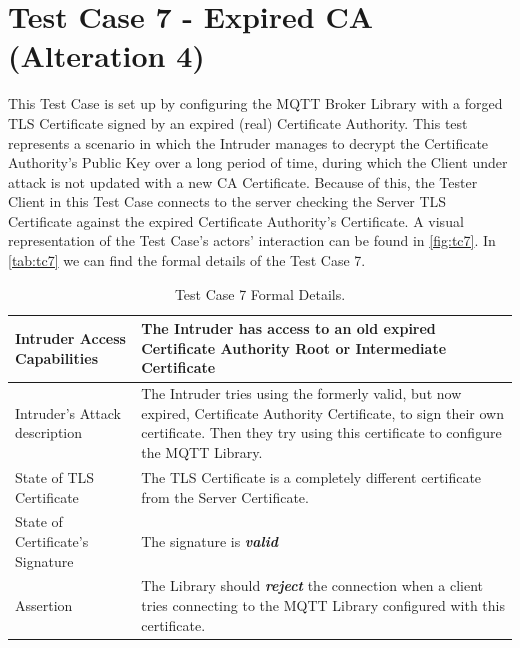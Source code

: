 \documentclass[binding=0.6cm,noexaminfo]{sapthesis}
\begin{document}
\section{Test Case 7 - Expired CA (Alteration 4)}
This Test Case is set up by configuring the MQTT Broker Library with a forged TLS Certificate signed by an expired (real) Certificate Authority. This test represents a scenario in which the Intruder manages to decrypt the Certificate Authority’s Public Key over a long period of time, during which the Client under attack is not updated with a new CA Certificate. Because of this, the Tester Client in this Test Case connects to the server checking the Server TLS Certificate against the expired Certificate Authority’s Certificate. A visual representation of the Test Case's actors' interaction can be found in \autoref{fig:tc7}.  In \autoref{tab:tc7} we can find the formal details of the Test Case 7.

\begin{table}
\begin{center}
\begin{tabular}{| p{6cm} | p{6cm} |}
\hline
Intruder Access Capabilities & The Intruder has access to an old expired Certificate Authority Root or Intermediate Certificate \\
\hline
Intruder’s Attack description & The Intruder tries using the formerly valid, but now expired, Certificate Authority Certificate, to sign their own certificate. Then they try using this certificate to configure the MQTT Library. \\
\hline
State of TLS Certificate & The TLS Certificate is a completely different certificate from the Server Certificate. \\
\hline
State of Certificate’s Signature & The signature is \textbf{\textit{valid}} \\
\hline
Assertion & The Library should \textbf{\textit{reject}} the connection when a client tries connecting to the MQTT Library configured with this certificate. \\
\hline
\end{tabular}
\caption{Test Case 7 Formal Details.}
\label{tab:tc7}
\end{center}
\end{table}
\end{document}
